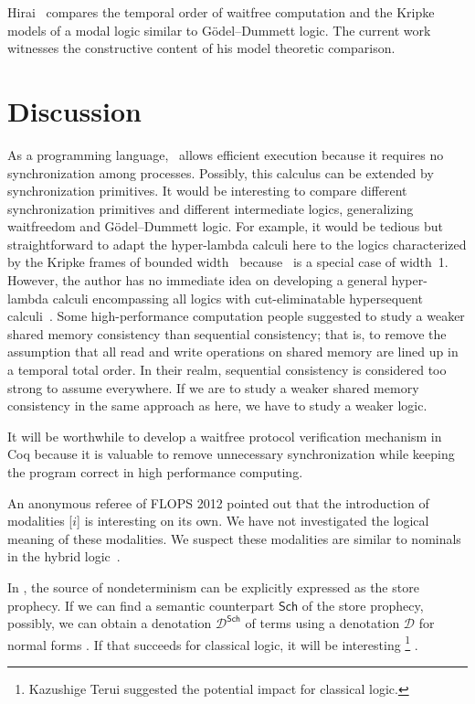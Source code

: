 Hirai~\cite{hirailpar,hiraimaster} compares the temporal order of waitfree
computation and the Kripke models of a modal logic similar to
G\"odel--Dummett logic.  The current
work witnesses the constructive content of
his model theoretic comparison.

\section{Discussion}
\label{future}

As a programming language, \lgd\, allows efficient execution because it
requires no synchronization among processes.
Possibly, this calculus can be extended by synchronization primitives.
It would be interesting to compare different synchronization primitives
and different intermediate logics, generalizing waitfreedom and
G\"odel--Dummett logic.
For example, it would be tedious but straightforward to adapt the
hyper-lambda calculi here to
the logics characterized by the Kripke frames of bounded
width~\citep{Ciabattoni01042001} because \lgd\, is a special case of
width~1.  However, the author has no immediate idea on
developing a general hyper-lambda calculi encompassing
all logics with cut-eliminatable hypersequent calculi~\citep{alg}.
Some high-performance computation people suggested to study a weaker
shared memory consistency than sequential consistency; that is, to
remove the assumption that all read and write operations on shared
memory are lined up in a temporal total order.
In their realm, sequential consistency is considered too strong to
assume everywhere.  If we are to study a weaker shared memory
consistency in the same approach as here,
we have to study a weaker logic.

It will be worthwhile to develop a waitfree protocol verification mechanism in Coq
because it is valuable to
remove unnecessary synchronization while keeping the program correct
in high performance computing.

An anonymous referee of FLOPS 2012 pointed out that the introduction of
modalities [$i$] is interesting on its own.
We have not investigated the logical meaning of these modalities.
We suspect these modalities are similar to nominals in the hybrid
logic~\citep{blackburn2000}.

In \lgd, the source of nondeterminism can be explicitly expressed as the
store prophecy.
If we can find a semantic counterpart $\mathsf{Sch}$ of the store
prophecy, possibly, we
can obtain a denotation $\mathcal{D}^\mathsf{Sch}$ of terms
using a denotation $\mathcal{D}$ for normal forms%
.
If that succeeds for classical logic, it will be interesting%
\footnote{Kazushige Terui suggested the potential impact for classical logic.}%
.

